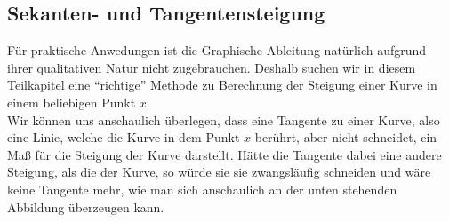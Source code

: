 \documentclass[../../main.tex]{subfiles}
\begin{document}
    \subsection{Sekanten- und Tangentensteigung}
    Für praktische Anwedungen ist die Graphische Ableitung natürlich aufgrund ihrer qualitativen Natur nicht zugebrauchen. Deshalb suchen wir in diesem Teilkapitel eine \enquote{richtige} Methode zu Berechnung der Steigung einer Kurve in einem beliebigen Punkt $x$.\\
    Wir können uns anschaulich überlegen, dass eine Tangente zu einer Kurve, also eine Linie, welche die Kurve in dem Punkt $x$ berührt, aber nicht schneidet, ein Maß für die Steigung der Kurve darstellt. Hätte die Tangente dabei eine andere Steigung, als die der Kurve, so würde sie sie zwangsläufig schneiden und wäre keine Tangente mehr, wie man sich anschaulich an der unten stehenden Abbildung überzeugen kann.
    
\end{document}
